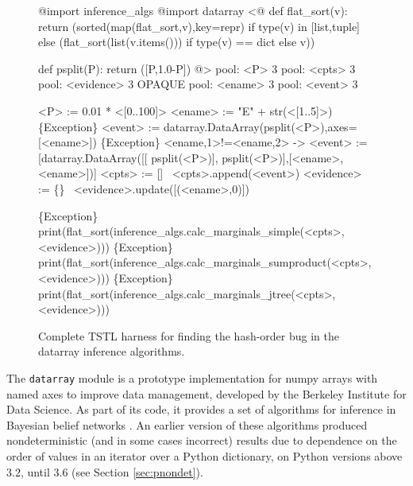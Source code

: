 \begin{figure}[t]
{\scriptsize
\begin{code}
@import inference\_algs
@import datarray
<@
def flat\_sort(v):
    return (sorted(map(flat\_sort,v),key=repr) if type(v) in [list,tuple]
                else (flat\_sort(list(v.items())) if type(v) == dict else v))

def psplit(P):
    return ([P,1.0-P])
@>
pool: <P> 3
pool: <cpts> 3
pool: <evidence> 3 OPAQUE
pool: <ename> 3
pool: <event> 3

<P> := 0.01 * <[0..100]>
<ename> := "E" + str(<[1..5]>)
\{Exception\} <event> := datarray.DataArray(psplit(<P>),axes=[<ename>])
\{Exception\} <ename,1>!=<ename,2> -> <event> := [datarray.DataArray([[
   psplit(<P>)], psplit(<P>)],[<ename>,<ename>])]
<cpts> := []
~<cpts>.append(<event>)
<evidence> := \{\}
~<evidence>.update([(<ename>,0)])

\{Exception\} print(flat\_sort(inference\_algs.calc\_marginals\_simple(<cpts>,
   <evidence>)))
\{Exception\} print(flat\_sort(inference\_algs.calc\_marginals\_sumproduct(<cpts>,
   <evidence>)))
\{Exception\} print(flat\_sort(inference\_algs.calc\_marginals\_jtree(<cpts>,
   <evidence>)))
\end{code}
}
\caption {Complete TSTL harness for finding the hash-order bug in the datarray
  inference algorithms.}
\label{hashbug}
\end{figure}

The {\tt datarray} module \cite{datarray} is a prototype
implementation for numpy arrays with named axes to improve data
management, developed by the Berkeley Institute for Data Science.  As part of its code, it provides a set of algorithms for
inference in
Bayesian belief networks \cite{russell2016artificial}.  An earlier
version of these algorithms produced nondeterministic (and in some
cases incorrect) results due to dependence on the order of values in
an iterator over a Python dictionary, on Python versions above 3.2,
until 3.6 (see Section \ref{sec:pnondet}).  

